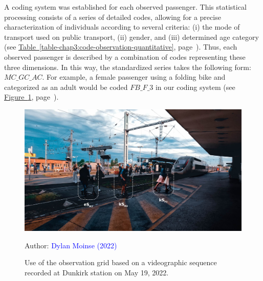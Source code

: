 \begin{refsegment}
A coding system was established for each observed passenger. This statistical processing consists of a series of detailed codes, allowing for a precise characterization of individuals according to several criteria: (i) the mode of transport used on public transport, (ii) gender, and (iii) determined age category (see \hyperref[table-chap3:code-observation-quantitative]{Table~\ref{table-chap3:code-observation-quantitative}}, page~\pageref{table-chap3:code-observation-quantitative}). Thus, each observed passenger is described by a combination of codes representing these three dimensions. In this way, the standardized series takes the following form: $MC\_GC\_AC$. For example, a female passenger using a folding bike and categorized as an adult would be coded $FB\_F\_3$ in our coding system (see \hyperref[fig-chap3:application-grille-observation-quantitative]{Figure~\ref{fig-chap3:application-grille-observation-quantitative}}, page~\pageref{fig-chap3:application-grille-observation-quantitative}).%


\begin{figure}[h!]\vspace*{4pt}
    \caption{Use of the observation grid based on a videographic sequence recorded at Dunkirk station on May 19, 2022.}
    \label{fig-chap3:application-grille-observation-quantitative}
    \centerline{\includegraphics[width=1\columnwidth]{src/Figures/Chap-3/EN_Observation_Codes_Gare_Dunkerque.jpg}}
    \vspace{5pt}
    \begin{flushright}\scriptsize{
    Author: \textcolor{blue}{Dylan Moinse (2022)}
    }\end{flushright}
\end{figure}
    

\end{refsegment}
